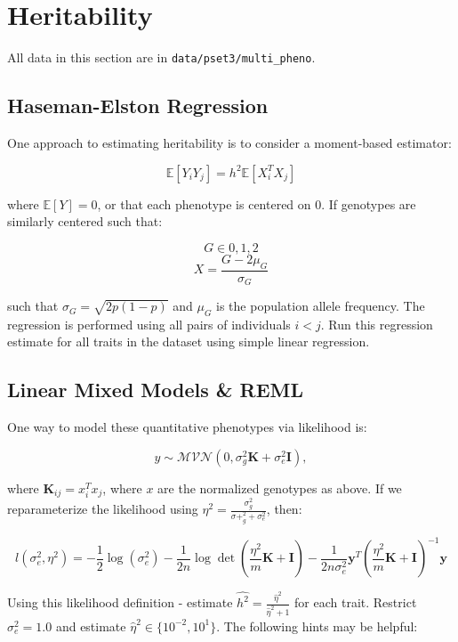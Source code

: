 \documentclass{pset}
\begin{document}
\section*{Heritability}


All data in this section are in \texttt{data/pset3/multi\_pheno}.

\subsection*{Haseman-Elston Regression}
 
One approach to estimating heritability is to consider a moment-based estimator: 

$$\mathbb{E}[Y_iY_j] = h^2 \mathbb{E}[X_i^TX_j]$$

where $\mathbb{E}[Y] = 0$, or that each phenotype is centered on 0. If genotypes are similarly centered such that: 

$$G \in {0,1,2}$$
$$X = \frac{G - 2\mu_G}{\sigma_G}$$ 

such that $\sigma_G = \sqrt{2p(1-p)}$ and $\mu_G$ is the population allele frequency. The regression is performed using all pairs of individuals $i < j$. Run this regression estimate for all traits in the dataset using simple linear regression.  

\subsection*{Linear Mixed Models \& REML}

One way to model these quantitative phenotypes via likelihood is: 

$$y \sim \mathcal{MVN}(0, \sigma^2_g \mathbf{K} + \sigma_e^2 \mathbf{I}),$$ 

where $\mathbf{K}_{ij} = x_i^Tx_j$, where $x$ are the normalized genotypes as above. If we reparameterize the likelihood using $\eta^2 = \frac{\sigma^2_g}{\sigma+^2_g + \sigma^2_e}$, then: 

$$
l(\sigma^2_e, \eta^2) = -\frac{1}{2}\log(\sigma^2_e) - \frac{1}{2n}\log \det\left(\frac{\eta^2}{m}\mathbf{K} + \mathbf{I}\right) -\frac{1}{2n\sigma^2_e} \mathbf{y}^T\left(\frac{\eta^2}{m}\mathbf{K} + \mathbf{I}\right)^{-1}\mathbf{y}
$$

Using this likelihood definition - estimate $\hat{h^2} = \frac{\hat{\eta}^2}{\hat{\eta}^2 + 1}$ for each trait. Restrict $\sigma^2_e = 1.0$ and estimate $\hat{\eta}^2 \in \{10^{-2}, 10^1\}$. The following hints may be helpful:
\end{document}
